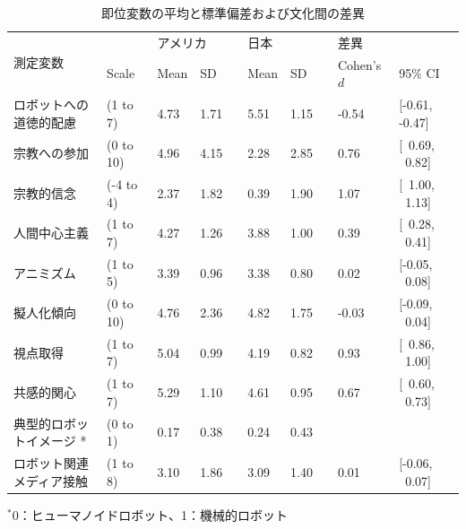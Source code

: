 \documentclass[a4j,12pt]{jreport}
\begin{document}
\begin{landscape}
\begin{table}[h]
  \begin{threeparttable}
\caption{即位変数の平均と標準偏差および文化間の差異}
\label{tab:Table_Desc}
\begin{tabular}{@{}llllllllll@{}}
\toprule
\multirow{2}{*}{測定変数}          &           & \multicolumn{2}{l}{アメリカ} &  & \multicolumn{2}{l}{日本} &  & \multicolumn{2}{l}{差異} \\ \cmidrule(lr){3-4} \cmidrule(lr){6-7} \cmidrule(l){9-10} 
                                  & Scale     & Mean          & SD            &  & Mean            & SD             &  & Cohen's $d$ & 95\% CI            \\ \midrule
ロボットへの道徳的配慮 & (1 to 7)  & 4.73          & 1.71          &  & 5.51            & 1.15           &  & -0.54     & {[}-0.61, -0.47{]} \\
宗教への参加                 & (0 to 10) & 4.96          & 4.15          &  & 2.28            & 2.85           &  & 0.76      & {[}~0.69, ~0.82{]}   \\
宗教的信念                & (-4 to 4) & 2.37          & 1.82          &  & 0.39            & 1.90           &  & 1.07      & {[}~1.00, ~1.13{]}   \\
人間中心主義                  & (1 to 7)  & 4.27          & 1.26          &  & 3.88            & 1.00           &  & 0.39      & {[}~0.28, ~0.41{]}   \\
アニミズム                           & (1 to 5)  & 3.39          & 0.96          &  & 3.38            & 0.80           &  & 0.02      & {[}-0.05, ~0.08{]}  \\
擬人化傾向                  & (0 to 10) & 4.76          & 2.36          &  & 4.82            & 1.75           &  & -0.03     & {[}-0.09, ~0.04{]}  \\
視点取得              & (1 to 7)  & 5.04          & 0.99          &  & 4.19            & 0.82           &  & 0.93      & {[}~0.86, ~1.00{]}   \\
共感的関心          & (1 to 7)  & 5.29          & 1.10          &  & 4.61            & 0.95           &  & 0.67     & {[}~0.60, ~0.73{]}   \\
典型的ロボットイメージ *  & (0 to 1)  & 0.17          & 0.38          &  & 0.24            & 0.43           &  &      &   \\ 
ロボット関連メディア接触   & (1 to 8)  & 3.10          & 1.86          &  & 3.09            & 1.40           &  & 0.01      & {[}-0.06, ~0.07{]}  \\\bottomrule
\end{tabular}
\begin{tablenotes}
      \small
      \item $^{*}$0：ヒューマノイドロボット、1：機械的ロボット
 \end{tablenotes}
  \end{threeparttable}

\end{table}
\end{landscape}
\end{document}
